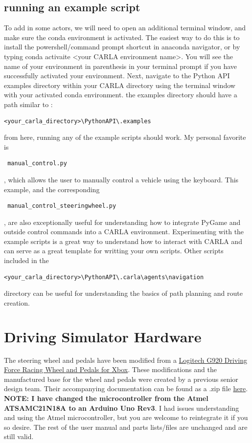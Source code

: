 \documentclass[12pt,oneside,letterpaper]{article}
\begin{document}
\subsection{running an example script}
To add in some actors, we will need to open an additional terminal window, and make sure the conda environment is activated. The easiest way to do this is to install the powershell/command prompt shortcut in anaconda navigator, or by typing conda activaite <your CARLA environment name>. You will see the name of your environment in parenthesis in your terminal prompt if you have successfully activated your environment. Next, navigate to the Python API examples directory within your CARLA directory using the terminal window with your activated conda environment. the examples directory should have a path similar to :
\begin{verbatim}<your_carla_directory>\PythonAPI\.examples  \end{verbatim}

from here, running any of the example scripts should work. My personal favorite is \begin{verbatim} manual_control.py \end{verbatim}, which allows the user to manually control a vehicle using the keyboard. This example, and the corresponding \begin{verbatim} manual_control_steeringwheel.py \end{verbatim} , are also exceptionally useful for understanding how to integrate PyGame and outside control commands into a CARLA environment.
Experimenting with the example scripts is a great way to understand how to interact with CARLA and can serve as a great template for writting your own scripts. Other scripts included in the  \begin{verbatim}<your_carla_directory>\PythonAPI\.carla\agents\navigation  \end{verbatim} directory can be useful for understanding the basics of path planning and route creation.

\section{Driving Simulator Hardware}
The steering wheel and pedals have been modified from a \href{https://www.logitechg.com/en-sa/products/driving/driving-force-racing-wheel.941-000123.html}{Logitech G920 Driving Force Racing Wheel and Pedals for Xbox}.  These modifications and the manufactured base for the wheel and pedals were created by a previous senior design team. Their accompanying documentation can be found as a .zip file \href{https://alabama.box.com/s/ppm0j7ax0zvq7z98z6g3qv7kapbet37a}{here}. \textbf{NOTE: I have changed the microcontroller from the Atmel ATSAMC21N18A to an Arduino Uno Rev3}. I had issues understanding and using the Atmel microcontroller, but you are welcome to reintegrate it if you so desire. The rest of the user manual and parts lists/files are unchanged and are still valid. 
\end{document}
